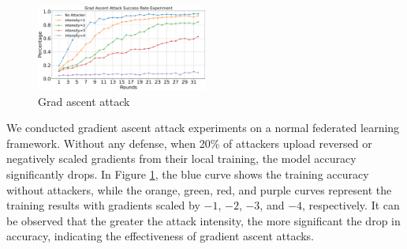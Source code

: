 \documentclass[conference]{IEEEtran}
\def\figGradAscentAttack{0.5\textwidth}
\begin{document}
\begin{figure}[htbp]
    \centerline{\includegraphics[width=\figGradAscentAttack]{pics/001-gradAttack-attackRate.pdf}}
    \vspace{-10px}  %
    \caption{Grad ascent attack\vspace{-8px}}
    \label{fig:gradAscent}
\end{figure}

We conducted gradient ascent attack experiments on a normal federated learning framework. Without any defense, when 20\% of attackers upload reversed or negatively scaled gradients from their local training, the model accuracy significantly drops. In Figure \hyperref[fig:gradAscent]{\ref{fig:gradAscent}}, the blue curve shows the training accuracy without attackers, while the orange, green, red, and purple curves represent the training results with gradients scaled by $-1$, $-2$, $-3$, and $-4$, respectively. It can be observed that the greater the attack intensity, the more significant the drop in accuracy, indicating the effectiveness of gradient ascent attacks.

\end{document}
